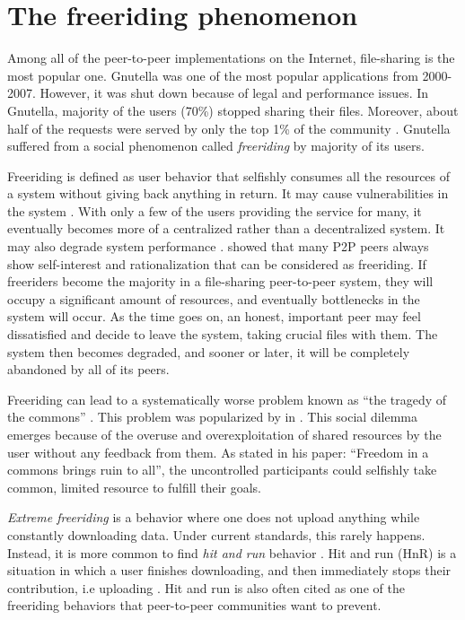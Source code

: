 \section{The freeriding phenomenon}
Among all of the peer-to-peer implementations on the Internet, file-sharing is the most popular one. Gnutella was one of the most popular applications from 2000-2007. However, it was shut down because of legal and performance issues. In Gnutella, majority of the users (70\%) stopped sharing their files. Moreover, about half of the requests were served by only the top 1\% of the community \cite{2000:freeridegnutella:adar}. Gnutella suffered from a social phenomenon called \textit{freeriding} by majority of its users.

Freeriding is defined as user behavior that selfishly consumes all the resources of a system without giving back anything in return. It may cause vulnerabilities in the system \cite{2000:freeridegnutella:adar}. With only a few of the users providing the service for many, it eventually becomes more of a centralized rather than a decentralized system. It may also degrade system performance \cite{2000:freeridegnutella:adar}. \citeauthor{2000:freeridegnutella:adar} showed that many P2P peers always show self-interest and rationalization that can be considered as freeriding. If freeriders become the majority in a file-sharing peer-to-peer system, they will occupy a significant amount of resources, and eventually bottlenecks in the system will occur. As the time goes on, an honest, important peer may feel dissatisfied and decide to leave the system, taking crucial files with them. The system then becomes degraded, and sooner or later, it will be completely abandoned by all of its peers.

Freeriding can lead to a systematically worse problem known as ``the tragedy of the commons'' \cite{1968:tragedycommon:hardin}. This problem was popularized by \citet*{1968:tragedycommon:hardin} in \citeyear{1968:tragedycommon:hardin}. This social dilemma emerges because of the overuse and overexploitation of shared resources by the user without any feedback from them. As \citeauthor{1968:tragedycommon:hardin} stated in his paper: ``Freedom in a commons brings ruin to all'', the uncontrolled participants could selfishly take common, limited resource to fulfill their goals.

\textit{Extreme freeriding} is a behavior where one does not upload anything while constantly downloading data. Under current standards, this rarely happens. Instead, it is more common to find \textit{hit and run} behavior \cite{2011:managesupplydemand:meulpolder}. Hit and run (HnR) is a situation in which a user finishes downloading, and then immediately stops their contribution, i.e uploading \cite{2014:sustainabilitytorrent:chen}. Hit and run is also often cited as one of the freeriding behaviors that peer-to-peer communities want to prevent. 

